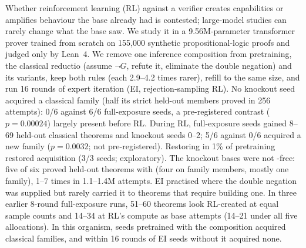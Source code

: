 Whether reinforcement learning (RL) against a verifier creates capabilities or amplifies behaviour the
base already had is contested; large-model studies can rarely change what the base saw. We study it in a
9.56M-parameter transformer prover trained from scratch on 155,000 synthetic propositional-logic proofs and judged only
by Lean~4. We remove one inference composition from pretraining, the classical reductio \sig{} (assume $\neg G$, refute
it, eliminate the double negation) and its variants, keep both rules (each 2.9--4.2 times rarer), refill to
the same size, and run 16 rounds of expert iteration (EI, rejection-sampling RL). No knockout seed acquired a
classical family (half its strict held-out members proved in 256 attempts): 0/6 against 6/6 full-exposure seeds, a
pre-registered contrast ($p=0.00024$) largely present before RL. During RL, full-exposure seeds gained 8--69 held-out
classical theorems and knockout seeds 0--2; 5/6 against 0/6 acquired a new family ($p=0.0032$; not pre-registered).
Restoring \sig{} in 1\% of pretraining restored acquisition (3/3 seeds; exploratory). The knockout bases were not
\sig-free: five of six proved held-out theorems with \sig{} (four on family members, mostly one family), 1--7 times in
1.1--1.4M attempts. EI practised \sig{} where the double negation was supplied but rarely carried it to theorems that require building one. In
three earlier 8-round full-exposure runs, 51--60 theorems look RL-created at equal sample counts and 14--34 at
RL's compute as base attempts (14--21 under all five allocations). In this organism, seeds pretrained with the composition acquired classical families, and within 16
rounds of EI seeds without it acquired none.
